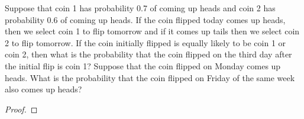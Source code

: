\begin{problem}{4.8}
  Suppose that coin 1 has probability 0.7 of coming up heads and coin 2 has probability
  0.6 of coming up heads. If the coin flipped today comes up heads, then we select
  coin 1 to flip tomorrow and if it comes up tails then we select coin 2 to flip tomorrow.
  If the coin initially flipped is equally likely to be coin 1 or coin 2, then
  what is the probability that the coin flipped on the third day after the initial
  flip is coin 1? Suppose that the coin flipped on Monday comes up heads. What is the probability
  that the coin flipped on Friday of the same week also comes up heads?
\end{problem}

\begin{proof}
\end{proof}
\newpage
